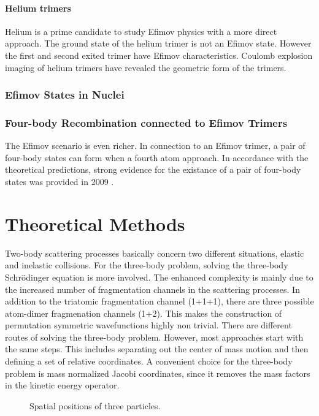 \documentclass{article}
\numberwithin{equation}{section}
\begin{document}
\paragraph{Helium trimers}
Helium is a prime candidate to study Efimov physics with a more direct approach. The ground state of the helium trimer is not an Efimov state. However the first and second exited trimer have Efimov characteristics. Coulomb explosion imaging of helium trimers have revealed the geometric form of the trimers. \cite{Kunitski:2015qth}

\subsubsection{Efimov States in Nuclei }

\subsubsection{Four-body Recombination connected to Efimov Trimers} 
The Efimov scenario is even richer. In connection to an Efimov trimer, a pair of four-body states can form when a fourth atom approach. In accordance with the theoretical predictions, strong evidence for the existance of a pair of four-body states was provided in 2009 \cite{Grimm:2009}. 

\section{Theoretical Methods} 
Two-body scattering processes basically concern two different situations, elastic and inelastic collisions. For the three-body problem, solving the three-body Schr{\"o}dinger equation is more involved. The enhanced complexity is mainly due to the increased number of fragmentation channels in the scattering processes. In addition to the triatomic fragmentation channel (1+1+1), there are three possible atom-dimer fragmenation channels (1+2). This makes the construction of permutation symmetric wavefunctions highly non trivial. There are different routes of solving the three-body problem. However, most approaches start with the same steps. This includes separating out the  center of mass motion and then defining a set of relative  coordinates. A convenient choice for the three-body problem is mass normalized Jacobi coordinates, since it removes the mass factors in the kinetic energy operator.     

\begin{figure}
	\centering
	
	\caption{Spatial positions of three particles.}
	\label{fig:1}
\end{figure}
\end{document}
